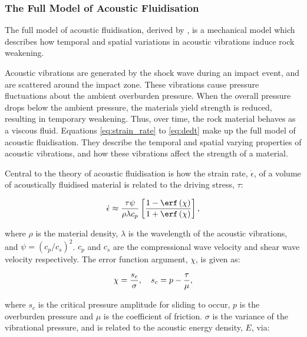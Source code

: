 \subsubsection{The Full Model of Acoustic Fluidisation \label{sec:acfl}}

The full model of acoustic fluidisation, derived by \citet{melosh1979acoustic}, is a mechanical model which describes how temporal and spatial variations in acoustic vibrations induce rock weakening.\bigskip

Acoustic vibrations are generated by the shock wave during an impact event, and are scattered around the impact zone. These vibrations cause pressure fluctuations about the ambient overburden pressure. When the overall pressure drops below the ambient pressure, the materials yield strength is reduced, resulting in temporary weakening. Thus, over time, the rock material behaves as a viscous fluid. Equations \ref{eq:strain_rate} to \ref{eq:dedt} make up the full model of acoustic fluidisation. They describe the temporal and spatial varying properties of acoustic vibrations, and how these vibrations affect the strength of a material.\bigskip

Central to the theory of acoustic fluidisation is how the strain rate, $\dot{\epsilon}$, of a volume of acoustically fluidised material is related to the driving stress, $\tau$:

\begin{equation}\label{eq:strain_rate}
\dot{\epsilon} \approx \frac{\tau \psi}{\rho \lambda c_{p}} \left[ \frac{1-\erf\left(\chi\right)}{1+\erf\left(\chi\right)}\right],\vspace{0.2cm}
\end{equation}

where $\rho$ is the material density, $\lambda$ is the wavelength of the acoustic vibrations, and $\psi = (c_{p}/c_{s})^{2}$. $c_{p}$ and $c_{s}$ are the compressional wave velocity and shear wave velocity respectively. The error function argument, $\chi$, is given as:

\begin{equation} \label{eq:sc}
\chi = \frac{s_{c}}{\sigma}, \quad s_{c}=p-\frac{\tau}{\mu},\vspace{0.2cm}
\end{equation}

where $s_{c}$ is the critical pressure amplitude for sliding to occur, $p$ is the overburden pressure and $\mu$ is the coefficient of friction. $\sigma$ is the variance of the vibrational pressure, and is related to the acoustic energy density, $E$, via:

